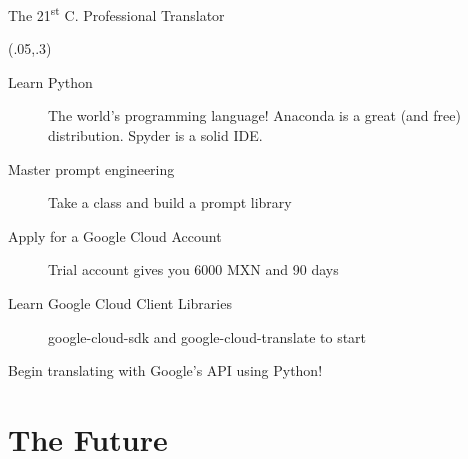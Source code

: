 \documentclass{beamer}
\begin{document}
\begin{frame}{The 21\textsuperscript{st}  C. Professional Translator}


\begin{textblock}{1}(.05,.3)
\begin{description}
  \item [Learn Python] The world's programming language! Anaconda is a great (and free) distribution. Spyder is a solid IDE.
  \item [Master prompt engineering] Take a class and build a prompt library
  \item [Apply for a Google Cloud Account] Trial account gives you 6000 MXN and 90 days
  \item [Learn Google Cloud Client Libraries] google-cloud-sdk and google-cloud-translate to start
  \item [Begin translating with Google's API using Python!]
\end{description}

\end{textblock}

\end{frame}

\section{The Future}
\end{document}
